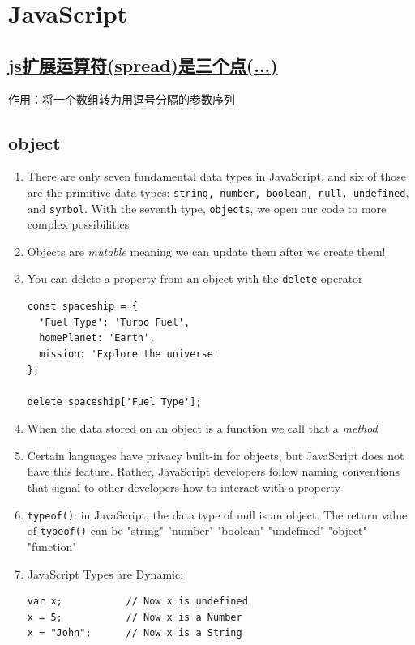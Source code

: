 \documentclass[a4paper, 12pt]{article}
\begin{document}
\section{JavaScript}

\subsection{\href{https://www.cnblogs.com/wangyunhui/p/7511615.html}{js扩展运算符(spread)是三个点(...)}}
作用：将一个数组转为用逗号分隔的参数序列

\subsection{object}
\begin{enumerate}
\item There are only seven fundamental data types in JavaScript, and six of those are the primitive data types: \verb|string, number, boolean, null, undefined|, and \verb|symbol|. With the seventh type, \verb|objects|, we open our code to more complex possibilities

\item Objects are \textit{mutable} meaning we can update them after we create them!

\item You can delete a property from an object with the \verb|delete| operator
\begin{verbatim}
const spaceship = {
  'Fuel Type': 'Turbo Fuel',
  homePlanet: 'Earth',
  mission: 'Explore the universe' 
};

delete spaceship['Fuel Type'];
\end{verbatim}

\item When the data stored on an object is a function we call that a \textit{method}

\item Certain languages have privacy built-in for objects, but JavaScript does not have this feature. Rather, JavaScript developers follow naming conventions that signal to other developers how to interact with a property

\item \verb|typeof()|: in JavaScript, the data type of null is an object. The return value of \verb|typeof()| can be "string" "number" "boolean" "undefined" "object" "function"

\item JavaScript Types are Dynamic:
\begin{verbatim}
var x;           // Now x is undefined
x = 5;           // Now x is a Number
x = "John";      // Now x is a String
\end{verbatim}


\end{enumerate}
\end{document}
